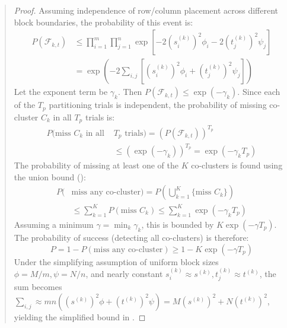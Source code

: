 \documentclass{ar2rc}
\theoremstyle{definition}
\theoremstyle{remark} %
\begin{document}
\begin{quote}
\begin{proof}
    Assuming independence of row/column placement across different block boundaries, the probability of this event is:
    \begin{equation}
      \begin{aligned}
        P(\mathcal{F}_{k,t}) & \le \prod_{i=1}^m \prod_{j=1}^n \exp\left[-2 (s_i^{(k)})^2 \phi_i -2 (t_j^{(k)})^2 \psi_j\right] \\
                             & = \exp\left( -2 \sum_{i,j} \left[ (s_i^{(k)})^2 \phi_i + (t_j^{(k)})^2 \psi_j \right] \right)
      \end{aligned}
    \end{equation}
    Let the exponent term be $\gamma_k$. Then $P(\mathcal{F}_{k,t}) \le \exp(-\gamma_k)$. Since each of the $T_p$ partitioning trials is independent, the probability of missing co-cluster $C_k$ in all $T_p$ trials is:
    \begin{equation}
      \begin{aligned}
        P(\text{miss } C_k \text{ in all } & T_p \text{ trials}) = (P(\mathcal{F}_{k,t}))^{T_p} \\
                                           & \le (\exp(-\gamma_k))^{T_p} = \exp(-\gamma_k T_p)
      \end{aligned}
    \end{equation}
    The probability of missing at least one of the $K$ co-clusters is found using the union bound ():
    \begin{equation}
      \begin{aligned}
        P( & \text{miss any co-cluster}) = P\left(\bigcup_{k=1}^K \{\text{miss } C_k\}\right) \\
           & \le \sum_{k=1}^K P(\text{miss } C_k) \le \sum_{k=1}^K \exp(-\gamma_k T_p)
      \end{aligned}
    \end{equation}
    Assuming a minimum $\gamma = \min_k \gamma_k$, this is bounded by $K \exp(-\gamma T_p)$. The probability of success (detecting all co-clusters) is therefore:
    \begin{equation}
      P = 1 - P(\text{miss any co-cluster}) \ge 1 - K \exp(-\gamma T_p)
    \end{equation}
    Under the simplifying assumption of uniform block sizes $\phi=M/m, \psi=N/n$, and nearly constant $s_i^{(k)} \approx s^{(k)}, t_j^{(k)} \approx t^{(k)}$, the sum becomes $\sum_{i,j} \approx mn \left( (s^{(k)})^2 \phi + (t^{(k)})^2 \psi \right) = M (s^{(k)})^2 + N (t^{(k)})^2$, yielding the simplified bound in .
  \end{proof}

\end{quote}
\end{document}

